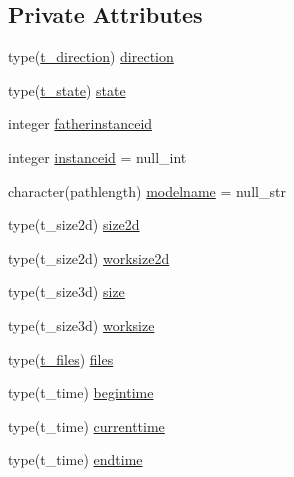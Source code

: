 \subsection*{Private Attributes}
\begin{DoxyCompactItemize}
\item 
type(\mbox{\hyperlink{structmodulehydrodynamic_1_1t__direction}{t\+\_\+direction}}) \mbox{\hyperlink{structmodulehydrodynamic_1_1t__hydrodynamic_a6d72af084089306c5de1b9d85dc31417}{direction}}
\item 
type(\mbox{\hyperlink{structmodulehydrodynamic_1_1t__state}{t\+\_\+state}}) \mbox{\hyperlink{structmodulehydrodynamic_1_1t__hydrodynamic_ae4af0eb2651f6bb7e781e47c76d5f345}{state}}
\item 
integer \mbox{\hyperlink{structmodulehydrodynamic_1_1t__hydrodynamic_a49a50a2752418cd2b75f3b725be75642}{fatherinstanceid}}
\item 
integer \mbox{\hyperlink{structmodulehydrodynamic_1_1t__hydrodynamic_a20fda4c29b4de5fa51c7944a3e2b5a11}{instanceid}} = null\+\_\+int
\item 
character(pathlength) \mbox{\hyperlink{structmodulehydrodynamic_1_1t__hydrodynamic_a614e921714705e2318a557da4517405d}{modelname}} = null\+\_\+str
\item 
type(t\+\_\+size2d) \mbox{\hyperlink{structmodulehydrodynamic_1_1t__hydrodynamic_aae6295de6e0921d18416f0f1bd699151}{size2d}}
\item 
type(t\+\_\+size2d) \mbox{\hyperlink{structmodulehydrodynamic_1_1t__hydrodynamic_a548ab9d3c54227ad2c2fc884f6667f3f}{worksize2d}}
\item 
type(t\+\_\+size3d) \mbox{\hyperlink{structmodulehydrodynamic_1_1t__hydrodynamic_a5866da6651d5e26e92635f52aae4e863}{size}}
\item 
type(t\+\_\+size3d) \mbox{\hyperlink{structmodulehydrodynamic_1_1t__hydrodynamic_ae49b919891533b25ec4ffc616ebaad36}{worksize}}
\item 
type(\mbox{\hyperlink{structmodulehydrodynamic_1_1t__files}{t\+\_\+files}}) \mbox{\hyperlink{structmodulehydrodynamic_1_1t__hydrodynamic_a2fa5a868ddac1fbe09233dd8fb44b14d}{files}}
\item 
type(t\+\_\+time) \mbox{\hyperlink{structmodulehydrodynamic_1_1t__hydrodynamic_a70648021885d76b60ed41f7dfe723e33}{begintime}}
\item 
type(t\+\_\+time) \mbox{\hyperlink{structmodulehydrodynamic_1_1t__hydrodynamic_ab22755bd15fe62b73390d984cb8c4810}{currenttime}}
\item 
type(t\+\_\+time) \mbox{\hyperlink{structmodulehydrodynamic_1_1t__hydrodynamic_a3534dc1810e44bc74f481c141c2fae7a}{endtime}}

\end{DoxyCompactItemize}
